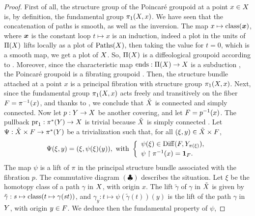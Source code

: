 \begin{proof}
  First of all,
  the structure group of the Poincar\'e groupoid at a point $x \in X$ is,
  by definition,
  the fundamental group $\pi_1(X,x)$.
  We have seen that the concatenation of paths is smooth,
  as well as the inversion.
  The map $x \mapsto \operatorname{class}({\boldsymbol x})$,
  where ${\boldsymbol x}$ is the constant loop $t \mapsto x$ is an induction,
  indeed a plot in the units of $\Pi(X)$ lifts locally as a plot of $\operatorname{Paths}(X)$,
  then taking the value for $t=0$,
  which is a smooth map,
  we get a plot of $X$.
  So, $\Pi(X)$ is a diffeological groupoid according to .
  Moreover, since the characteristic map $\operatorname{ends} : \Pi(X) \to X$ is a subduction ,
  the Poincar\'e groupoid is a fibrating groupoid .
  Then,
  the structure bundle attached at a point $x$  is a principal fibration with structure group $\pi_1(X,x)$.
  Next,
  since the fundamental group $\pi_1(X,x)$ acts freely and transitively on the fiber $F = \pi^{-1}(x)$,
  and thanks to ,
  we conclude that $\tilde{X}$ is connected and simply connected.
  Now let $p : Y \to X$ be another covering,
  and let $F = p^{-1}(x)$.
  The pullback $\mathrm{pr}_1 : \pi^*(Y) \to X$ is trivial because $\tilde{X}$ is simply connected .
  Let $\Psi : \tilde{X} \times F \to \pi^*(Y)$ be a trivialization such that,
  for all $(\xi,y) \in \tilde{X} \times F$,
  $$%
  \Psi(\xi,y) = (\xi, \psi(\xi)(y)), \text{ with }
  \left\{
  \begin{array}{l}
    \psi(\xi) \in \Diff(\F,\Y_{\pi(\xi)}), \\
    \vspace{-10pt} \\
    \psi \restriction \pi^{-1}(x) = \id_\F.
  \end{array}
  \right.
  $$%
  The map $\psi$ is a lift of $\pi$ in the principal structure bundle associated with the fibration $p$.
  The commutative diagram $(\clubsuit)$ describes the situation.
  Let $\xi$ be the homotopy class of a path $\gamma$ in $X$,
  with origin $x$.
  The lift $\tilde\gamma$ of $\gamma$ in $\tilde{X}$ is given by $\tilde\gamma : s \mapsto \operatorname{class}(t \mapsto \gamma(st))$,
  and $\gamma_y : t \mapsto \psi(\tilde\gamma(t))(y)$ is the lift of the path $\gamma$ in $Y$,
  with origin $y \in F$.
  We deduce then the fundamental property of $\psi$,

\end{proof}
